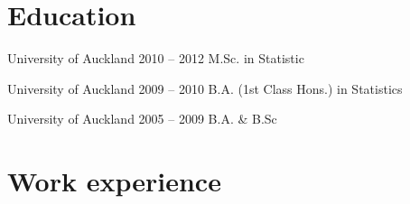 \documentclass{tccv}
\begin{document}
\section{Education}

\begin{yearlist}



  
\item[University of Auckland]{2010 -- 2012}
     {M.Sc. in Statistic}
{}

\item[University of Auckland]{2009 -- 2010}
     {B.A. (1st Class Hons.) \newline in Statistics}
{}

\item[University of Auckland]{2005 -- 2009}
  {B.A. \& B.Sc}
  {}





\end{yearlist}


\section{Work experience}
\end{document}

